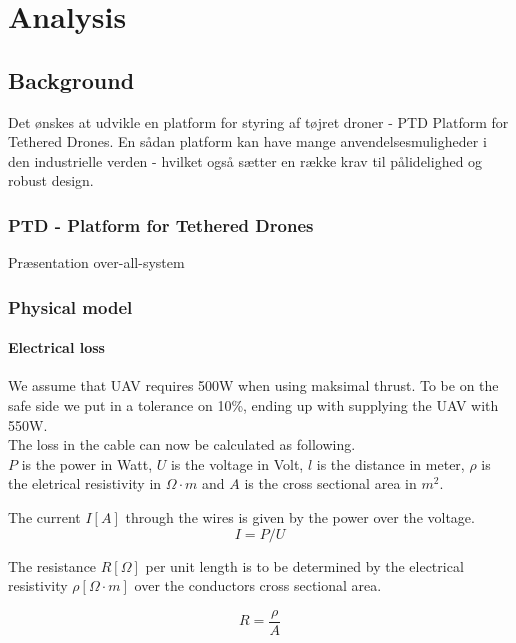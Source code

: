 
\chapter{Analysis}

\section{Background}
Det ønskes at udvikle en platform for styring af tøjret droner - PTD Platform for Tethered Drones. En sådan platform kan have mange anvendelsesmuligheder i den industrielle verden - hvilket også sætter en række krav til pålidelighed og robust design. 

\subsection{PTD - Platform for Tethered Drones}

Præsentation over-all-system

\subsection{Physical model}

\subsubsection{Electrical loss}
We assume that UAV requires 500W when using maksimal thrust. To be on the safe side we put in a tolerance on 10\%, ending up with supplying the UAV with 550W. \\
The loss in the cable can now be calculated as following.\\ 
$P$ is the power in Watt, $U$ is the voltage in Volt, $l$ is the distance in meter, $\rho$ is the eletrical resistivity in $\Omega \cdot m$ and $A$ is the cross sectional area in $m^2$.

The current $I[A]$ through the wires is given by the power over the voltage.
\begin{equation}
I = P/U
\end{equation}

The resistance $R[\Omega]$ per unit length is to be determined by the electrical resistivity $\rho [\Omega \cdot m]$ over the conductors cross sectional area.

\begin{equation}
R = \frac{\rho}{A}
\end{equation}

